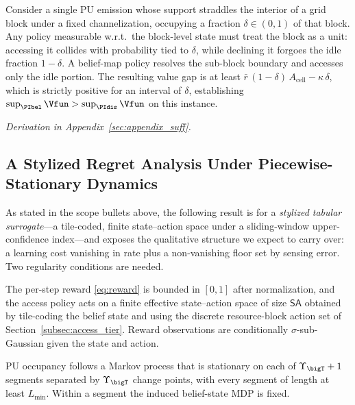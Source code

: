 \begin{example}
\label{ex:strictgap}
Consider a single PU emission whose support straddles the interior of a grid
block under a fixed channelization, occupying a fraction $\delta\in(0,1)$ of
that block. Any policy measurable w.r.t.\ the block-level state must treat
the block as a unit: accessing it collides with probability tied to
$\delta$, while declining it forgoes the idle fraction $1-\delta$. A
belief-map policy resolves the sub-block boundary and accesses only the idle
portion. The resulting value gap is at least
$\bar r\,(1-\delta)\,A_{\mathrm{cell}}-\kappa\,\delta$, which is strictly
positive for an interval of $\delta$, establishing
$\sup_{\PIbel}\Vfun>\sup_{\PIdis}\Vfun$ on this instance.
\end{example}
\noindent\emph{Derivation in Appendix~\ref{sec:appendix_suff}.}

\subsection{A Stylized Regret Analysis Under Piecewise-Stationary Dynamics}
\label{subsec:thmC}

As stated in the scope bullets above, the following result is for a
\emph{stylized tabular surrogate}---a tile-coded, finite state--action space
under a sliding-window upper-confidence index---and exposes the qualitative
structure we expect to carry over: a learning cost vanishing in rate plus a
non-vanishing floor set by sensing error. Two regularity conditions are needed.

\begin{assumption}
\label{as:bounded}
The per-step reward \eqref{eq:reward} is bounded in $[0,1]$ after
normalization, and the access policy acts on a finite effective
state--action space of size $\mathsf{SA}$ obtained by tile-coding the belief
state and using the discrete resource-block action set of
Section~\ref{subsec:access_tier}. Reward observations are conditionally
$\sigma$-sub-Gaussian given the state and action.
\end{assumption}

\begin{assumption}
\label{as:switch}
PU occupancy follows a Markov process that is stationary on each of
$\Upsilon_{\bigT}+1$ segments separated by $\Upsilon_{\bigT}$ change points,
with every segment of length at least $L_{\min}$. Within a segment the
induced belief-state MDP is fixed.
\end{assumption}

